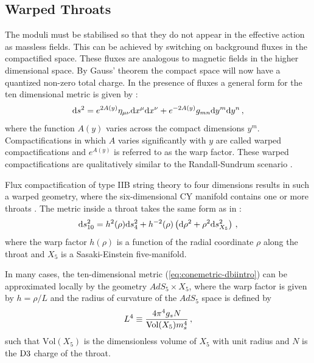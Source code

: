 \subsection{Warped Throats}
\label{sec:warpedthroats-dbiintro}
The moduli must
be stabilised so that they do not appear in the effective action as
massless fields. This can be achieved by switching on background fluxes in the
compactified space. These fluxes are analogous to magnetic
fields in the higher dimensional space. By Gauss' theorem  the compact space
will now have a quantized non-zero total charge.
In the presence of fluxes a general form for the ten dimensional metric is given by
\cite{Baumann:2009ni}:
\begin{equation}
\label{eq:warpedmetric-dbiintro}
 \mathrm{d} s^2 = e^{2A(y)}\eta_{\mu\nu} \mathrm{d} x^\mu \mathrm{d} x^\nu + e^{-2A(y)} g_{mn}\mathrm{d} y^m
\mathrm{d} y^n\,,
\end{equation}
where the function $A(y)$ varies across the compact dimensions $y^m$.
Compactifications in which $A$ varies significantly with $y$ are called warped
compactifications and $e^{A(y)}$ is referred to as the warp factor. These warped
compactifications are qualitatively similar to
the Randall-Sundrum scenario \cite{Randall1999,Brummer2006}.


Flux compactification of type IIB string theory to four dimensions 
results in such a warped geometry, where the six-dimensional CY  
manifold contains one or more throats \cite{douglas,gkp,grana}. 
The metric inside a throat takes the same form as in
:
% 
\begin{equation}
\label{eq:conemetric-dbiintro}
\mathrm{d} s_{10}^2= h^2 ( \rho) \mathrm{d} s_4^2 + h^{-2} (\rho ) 
\left( \mathrm{d}\rho^2 +\rho^2 \mathrm{d} s_{X_5}^2 \right) \,,
\end{equation}
%  
where the warp factor $h (\rho)$ is a function of the 
radial coordinate $\rho$ along the throat and $X_5$
is a Sasaki-Einstein five-manifold. 


In many cases, the ten-dimensional metric (\ref{eq:conemetric-dbiintro}) can be 
approximated locally by the geometry $AdS_5 \times X_5$, where the 
warp factor is given by $h=\rho /L$ and 
the radius of curvature of the $AdS_5$ space is defined by
%  
\begin{equation}
L^4 \equiv \frac{4\pi^4 g_s N}{{\rm Vol} (X_5) m_s^4} \,,
\end{equation}
% 
such that $\mathrm{Vol}(X_5)$ is the dimensionless volume of 
$X_5$ with unit radius and $N$ is the ${\rm D3}$  charge of the throat.


